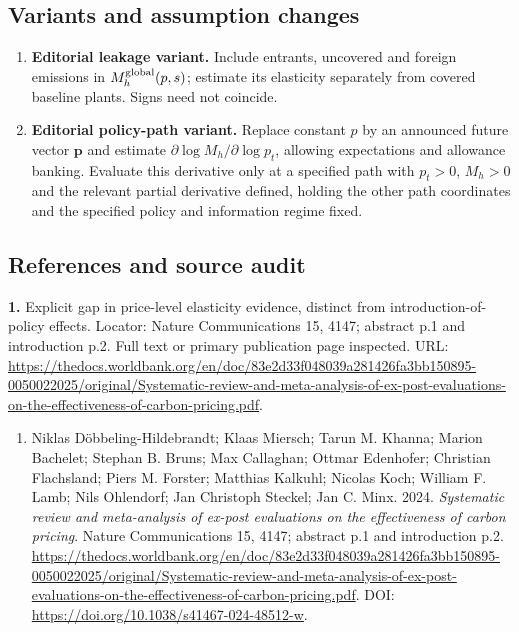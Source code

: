 \documentclass[11pt,a4paper]{article}
\begin{document}
\subsection*{Variants and assumption changes}
\begin{enumerate}
\item \textbf{Editorial leakage variant.} Include entrants, uncovered and foreign emissions in \(M_h^{\rm global}(p,s)\); estimate its elasticity separately from covered baseline plants. Signs need not coincide.
\item \textbf{Editorial policy-path variant.} Replace constant \(p\) by an announced future vector \(\mathbf p\) and estimate \(\partial\log M_h/\partial\log p_t\), allowing expectations and allowance banking. Evaluate this derivative only at a specified path with \(p_t>0\), \(M_h>0\) and the relevant partial derivative defined, holding the other path coordinates and the specified policy and information regime fixed.
\end{enumerate}
\subsection*{References and source audit}
\textbf{1.} Explicit gap in price-level elasticity evidence, distinct from introduction-of-policy effects. Locator: Nature Communications 15, 4147; abstract p.1 and introduction p.2. Full text or primary publication page inspected. URL: \url{https://thedocs.worldbank.org/en/doc/83e2d33f048039a281426fa3bb150895-0050022025/original/Systematic-review-and-meta-analysis-of-ex-post-evaluations-on-the-effectiveness-of-carbon-pricing.pdf}.
\begin{enumerate}\raggedright
\item\hypertarget{definitions:source:30007717:1}{} Niklas Döbbeling-Hildebrandt; Klaas Miersch; Tarun M. Khanna; Marion Bachelet; Stephan B. Bruns; Max Callaghan; Ottmar Edenhofer; Christian Flachsland; Piers M. Forster; Matthias Kalkuhl; Nicolas Koch; William F. Lamb; Nils Ohlendorf; Jan Christoph Steckel; Jan C. Minx. 2024. \emph{Systematic review and meta-analysis of ex-post evaluations on the effectiveness of carbon pricing}. Nature Communications 15, 4147; abstract p.1 and introduction p.2.
\url{https://thedocs.worldbank.org/en/doc/83e2d33f048039a281426fa3bb150895-0050022025/original/Systematic-review-and-meta-analysis-of-ex-post-evaluations-on-the-effectiveness-of-carbon-pricing.pdf}.
DOI: \url{https://doi.org/10.1038/s41467-024-48512-w}.
\end{enumerate}
\end{document}
